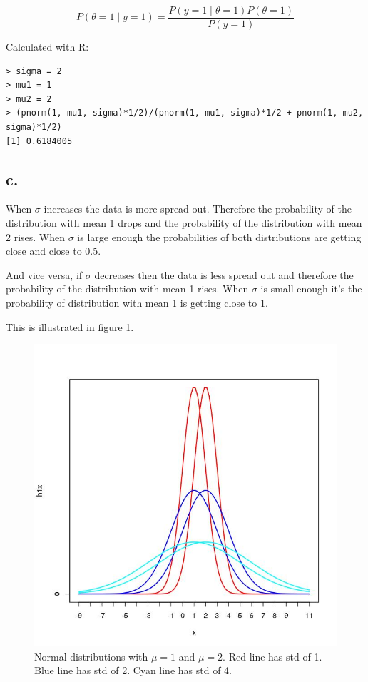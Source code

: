 \documentclass[11pt]{amsart}
\begin{document}
\[
    P(\theta = 1 \mid y = 1) = \frac{P(y=1 \mid \theta = 1) P(\theta=1)}{P(y=1)}
\]

Calculated with R:

\begin{verbatim}
> sigma = 2
> mu1 = 1
> mu2 = 2
> (pnorm(1, mu1, sigma)*1/2)/(pnorm(1, mu1, sigma)*1/2 + pnorm(1, mu2, sigma)*1/2)
[1] 0.6184005
\end{verbatim}

\subsection*{c.}

When $\sigma$ increases the data is more spread out. Therefore the probability of the distribution with mean 1 drops and the probability of the distribution with mean 2 rises. When $\sigma$ is large enough the probabilities of both distributions are getting close and close to 0.5.

And vice versa, if $\sigma$ decreases then the data is less spread out and therefore the probability of the distribution with mean 1 rises. When $\sigma$ is small enough it's the probability of distribution with mean 1 is getting close to 1.

This is illustrated in figure \ref{fig:3-c}.

\begin{figure}[ht!]
  \includegraphics[width=\linewidth]{3-c}
  \caption{Normal distributions with $\mu = 1$ and $\mu = 2$. Red line has std of 1. Blue line has std of 2. Cyan line has std of 4.}
  \label{fig:3-c}
\end{figure}
\end{document}
